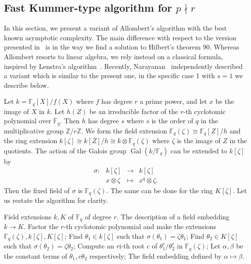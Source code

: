 \documentclass[12pt]{article}
\theoremstyle{plain}
\theoremstyle{definition}
\DeclareMathOperator{\gal}{Gal} %
\def\Z{\ensuremath{\mathbb{Z}}}
\def\F{\ensuremath{\mathbb{F}}}
\newcounter{algorithm}
\begin{document}
\subsection{Fast Kummer-type algorithm for $p \nmid r$}
\label{sec:fast-kummer}

In this section, we present a variant of Allombert's algorithm with the
best known asymptotic complexity. The main difference with respect to the 
version presented in~\cite{Allombert02} is in the way we find a solution
to Hilbert's theorem 90.
Whereas Allombert resorts to linear algebra, we rely instead on a classical
formula, inspired by Lenstra's algorithm~\cite[Th.~5.2]{LenstraJr91}.
Recently, Narayanan~\cite[Sec.~3]{narayanan2016fast} independently described 
a variant which is similar to the present one, in the specific case 1 with $s=1$ 
we describe below.

Let $k=\F_q[X]/f(X)$ where $f$ has degree $r$ a prime power, and let $x$ be the image of $X$ in $k$.
Let $h(Z)$ be an 
irreducible factor of the $r$-th cyclotomic polynomial over $\F_q$. Then $h$ has degree $s$ where 
$s$ is the order of $q$ in the multiplicative group $\Z/r\Z$. We form the field extension 
$\F_q(\zeta) \cong \F_q[Z] / h$ and the ring extension $k[\zeta] \cong k[Z] / h \cong k \otimes 
\F_q(\zeta)$ where $\zeta$ is the image of $Z$ in the quotients. The action of the Galois group 
$\gal(k / \F_q)$ can be extended to $k[\zeta]$ by
\[
\begin{array}{llll}
\sigma: & k[\zeta] & \rightarrow & k[\zeta] \\
& x \otimes \zeta & \mapsto & x^q \otimes \zeta.
\end{array}
\]
Then the fixed field of $\sigma$ is $\F_q(\zeta)$. The same can be done for the ring $K[\zeta]$. 
Let us restate the algorithm for clarity.

\begin{algorithm}
	\begin{algorithmic}[1]
		\REQUIRE Field extensions $k, K$ of $\F_q$ of degree $r$.
		\ENSURE The description of a field embedding $k\to K$.
		\STATE Factor the $r$-th cyclotomic polynomial and make the extensions $\F_q(\zeta), 
		k[\zeta], K[\zeta]$;
		\STATE Find $\theta_1 \in k[\zeta]$ such that $\sigma(\theta_1) = \zeta\theta_1$;
		\STATE Find $\theta_2 \in K[\zeta]$ such that $\sigma(\theta_2) = \zeta\theta_2$;
		\STATE Compute an $r$i-th root $c$ of $\theta_1^r / \theta_2^r$ in $\F_q(\zeta)$;
		\STATE Let $\alpha, \beta$ be the constant terms of $\theta_1, c\theta_2$ respectively;
		\RETURN The field embedding defined by $\alpha\mapsto\beta$.
	\end{algorithmic}
\end{algorithm}
\end{document}
